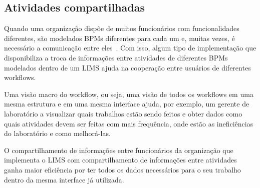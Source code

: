\subsection{Atividades compartilhadas}


Quando uma organização dispõe de muitos funcionários com funcionalidades diferentes, são modelados BPMs diferentes para cada um e, muitas vezes, é necessário a comunicação entre eles~\cite{Holbein1996AOrganisations}. Com isso, algum tipo de implementação que disponibiliza a troca de informações entre atividades de diferentes BPMs modelados dentro de um LIMS ajuda na cooperação entre usuários de diferentes workflows.






Uma visão macro do workflow, ou seja, uma visão de todos os workflows em uma mesma estrutura e em uma mesma interface ajuda, por exemplo, um gerente de laboratório a visualizar quais trabalhos estão sendo feitos e obter dados como quais atividades devem ser feitas com mais frequência, onde estão as ineficiências do laboratório e como melhorá-las.

O compartilhamento de informações entre funcionários da organização que implementa o LIMS com compartilhamento de informações entre atividades ganha maior eficiência por ter todos os dados necessários para o seu trabalho dentro da mesma interface já utilizada.

